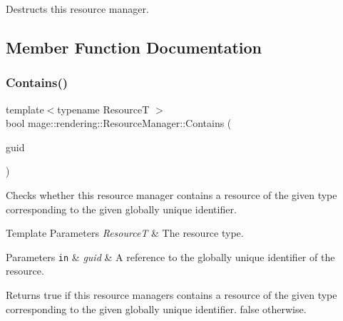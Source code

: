 Destructs this resource manager. 

\subsection{Member Function Documentation}
\hypertarget{classmage_1_1rendering_1_1_resource_manager_a7df24baa95d7a43697cba243dd5b5a54}{}\label{classmage_1_1rendering_1_1_resource_manager_a7df24baa95d7a43697cba243dd5b5a54} 
\subsubsection{\texorpdfstring{Contains()}{Contains()}}
{\footnotesize\ttfamily template$<$typename ResourceT $>$ \\
bool mage\+::rendering\+::\+Resource\+Manager\+::\+Contains (\begin{DoxyParamCaption}\item[{const typename \hyperlink{classmage_1_1rendering_1_1_resource_manager_a097b505b275b411e02c73d1899e91a44}{key\+\_\+type}$<$ ResourceT $>$ \&}]{guid }\end{DoxyParamCaption})\hspace{0.3cm}{\ttfamily [noexcept]}}

Checks whether this resource manager contains a resource of the given type corresponding to the given globally unique identifier.


\begin{DoxyTemplParams}{Template Parameters}
{\em ResourceT} & The resource type. \\
\hline
\end{DoxyTemplParams}

\begin{DoxyParams}[1]{Parameters}
\mbox{\tt in}  & {\em guid} & A reference to the globally unique identifier of the resource. \\
\hline
\end{DoxyParams}
\begin{DoxyReturn}{Returns}
{\ttfamily true} if this resource managers contains a resource of the given type corresponding to the given globally unique identifier. {\ttfamily false} otherwise. 
\end{DoxyReturn}
\hypertarget{classmage_1_1rendering_1_1_resource_manager_aeb229ae49bde59cb6c146f9749851363}{}\label{classmage_1_1rendering_1_1_resource_manager_aeb229ae49bde59cb6c146f9749851363} 
